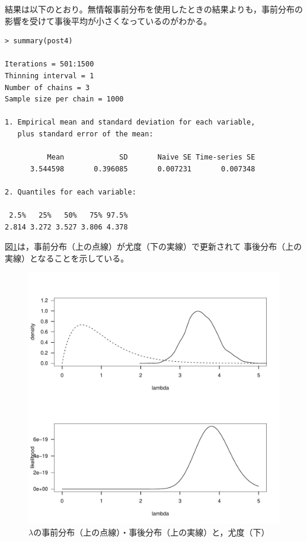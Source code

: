 \documentclass[11pt,uplatex]{jsarticle}
\begin{document}
結果は以下のとおり。無情報事前分布を使用したときの結果よりも，事前分布の
影響を受けて事後平均が小さくなっているのがわかる。

\begin{lstlisting}
> summary(post4)

Iterations = 501:1500
Thinning interval = 1 
Number of chains = 3 
Sample size per chain = 1000 

1. Empirical mean and standard deviation for each variable,
   plus standard error of the mean:

          Mean             SD       Naive SE Time-series SE 
      3.544598       0.396085       0.007231       0.007348 

2. Quantiles for each variable:

 2.5%   25%   50%   75% 97.5% 
2.814 3.272 3.527 3.806 4.378 

\end{lstlisting}

図\ref{prior_posterior}は，事前分布（上の点線）が尤度（下の実線）で更新されて
事後分布（上の実線）となることを示している。

\begin{figure}[htbp]
	\begin{center}
		\includegraphics[bb=0 0 480 480, clip, width=320 bp]{example1-4.pdf}
	\end{center}
	\caption{$\lambda$の事前分布（上の点線）・事後分布（上の実線）と，尤度（下）}
	\label{prior_posterior}
\end{figure}
\end{document}
